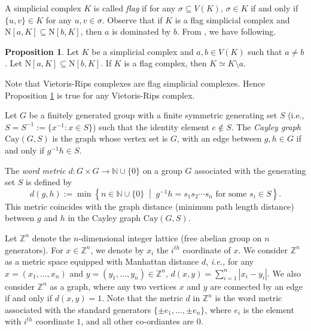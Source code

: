 \documentclass{amsart}
\theoremstyle{definition}
\newtheorem{proposition}[theorem]{Proposition}
\theoremstyle{remark}
\numberwithin{equation}{section}
\def\Z{{\mathbb{Z}}}
\def\n{{\mathrm{N}}}
\begin{document}
A simplicial complex $K$ is called {\it flag} if for any $\sigma \subseteq V(K)$, $\sigma \in K$ if and only if $\{u, v\} \in K$ for any $u, v \in \sigma$.  	Observe that if $K$ is a flag simplicial complex and $\n[a, K]\subseteq \n[b, K]$, then $a$ is dominated by $b$. From \cite[Proposition 3.2]{Prisner1992}, we have following. 


\begin{proposition}\label{flag}
	Let $K$ be a simplicial complex and $a,b\in V(K)$ such that $a \neq b$. Let $\n[a, K]\subseteq \n[b, K]$. If $K$ is a flag complex, then $K \simeq K \setminus a$.
\end{proposition}

Note that Vietoris-Rips complexes are flag simplicial complexes. Hence Proposition \ref{flag} is true for any  Vietoris-Rips complex.




Let $G$ be a finitely generated group with a finite symmetric generating set $S$ (i.e., $S = S^{-1} := \{x^{-1} : x \in S\}$) such that the identity element $e \notin S$. The {\em Cayley graph} $\mathrm{Cay}(G, S)$ is the graph whose vertex set is $G$, with an edge between $g, h \in G$ if and only if $g^{-1}h \in S$.

The {\em word metric}   $d: G \times G \to \mathbb{N} \cup \{0\}$  on a group $G$ associated with the generating set $S$ is defined by
$$
d(g, h) := \min \left\{ n \in \mathbb{N} \cup \{0\} \;\middle|\; g^{-1}h = s_1 s_2 \cdots s_n \text{ for some } s_i \in S \right\}.
$$
This metric coincides with the graph distance (minimum path length distance) between $g$ and $h$ in the Cayley graph $\mathrm{Cay}(G, S)$.





Let $\Z^n$ denote the $n$-dimensional integer lattice (free abelian group  on $n$ generators). For $x\in \mathbb{Z}^n$, we denote by $x_i$ the $i^{th}$ coordinate of $x$. We consider $\Z^n$ as a metric space equipped with Manhattan distance $d$, {\it i.e.,}   for any $x = (x_1, \ldots, x_n)$ and $y = (y_1, \ldots, y_n) \in \Z^n$, $d(x, y) = \sum_{i = 1}^n |x_i - y_i|$. We also consider $\Z^n$ as a graph, where any two vertices $x$ and $y$ are connected by an edge if and only if $d(x, y) = 1$. Note that 
the metric $d$ in $\Z^n$ is the word metric associated with the standard generators $\{\pm e_1, \ldots, \pm e_n\}$, where $e_i$ is the element with $i^{th}$ coordinate $1$, and all other co-ordiantes are $0$. 
\end{document}
